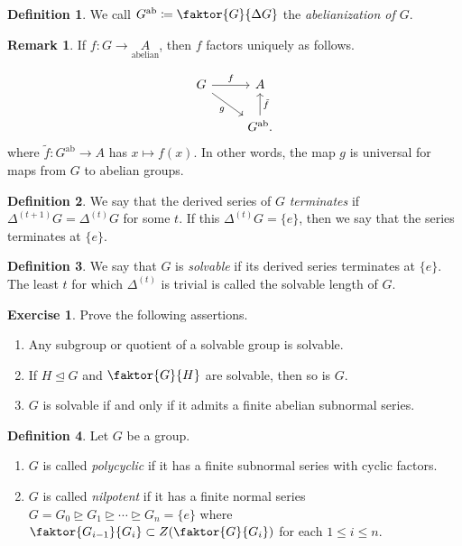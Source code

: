 \documentclass[10pt,letterpaper,cm]{nupset}
\theoremstyle{definition}
\newtheorem*{definition}{Definition}
\newtheorem{remark}{Remark}
\newtheorem{exercise}{Exercise}
\newcommand{\1}{\mathbf{1}}
\newcommand{\0}{\vec 0}
\DeclareMathOperator{\ab}{ab}
\begin{document}
\begin{definition}
We call $G^{\ab}\coloneqq  \faktor{G}{\Delta G}$ the \textit{abelianization of $G$}.
\end{definition}

\begin{remark}
If $f: G \to \underset{\text{abelian}} A$, then $f$ factors uniquely as follows.

\[ \begin{tikzcd}
G \arrow[r, "f"] \arrow[dr, "g", swap] & A \\%
 & G^{\ab}\arrow[u, "\tilde{f}", swap].
\end{tikzcd}
\]
where $\tilde{f}: G^{\ab} \to A$ has $x\mapsto f(x)$.
In other words, the map $g$ is universal for maps from $G$ to abelian groups. 
\end{remark}

\begin{definition}
We say that the derived series of $G$ \textit{terminates} if $\Delta^{(t+1)}G = \Delta^{(t)}G$ for some $t$. If this $\Delta^{(t)}G=\{e\}$, then we say that the series terminates at $\{e\}$.
\end{definition}

\begin{definition}
We say that $G$ is \textit{solvable} if its derived series terminates at $\{e\}$. The least $t$ for which $\Delta^{(t)}$ is trivial is called the solvable length of $G$.
\end{definition}

\begin{exercise}{Prove the following assertions.}
\begin{enumerate}
\item Any subgroup or quotient of a solvable group is solvable.
\item If $H\unlhd G$ and $\faktor{G}{H}$ are solvable, then so is $G$.
\item $G$ is solvable  if and only if it admits a finite abelian subnormal series. 
\end{enumerate}
\end{exercise}

\begin{definition}{Let $G$ be a group.}
\begin{enumerate}
\item $G$ is called \textit{polycyclic} if it has a finite subnormal series with cyclic factors.
\item $G$ is called \textit{nilpotent} if it has a finite normal series  $G =G_0 \unrhd G_1 \unrhd \cdots \unrhd G_n = \{e\}$ where $\faktor{G_{i-1}}{G_i}\subset Z(\faktor{G}{G_i})$ for each $1\leq i\leq n$.
\end{enumerate}
\end{definition}
\end{document}
